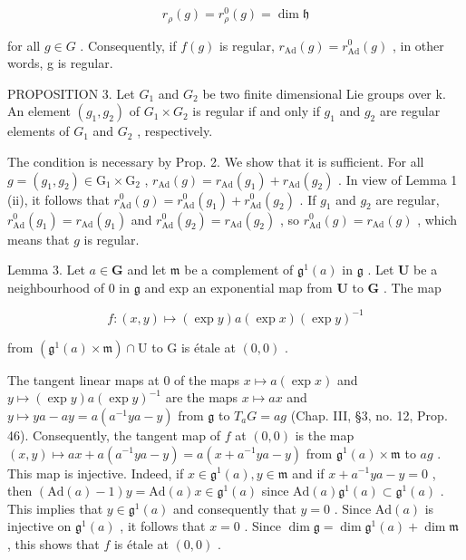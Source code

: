 \[
r _ {\rho} (g) = r _ {\rho} ^ {0} (g) = \dim \mathfrak {h}
\]

for all \(g \in G\) . Consequently, if \(f(g)\) is regular, \(r_{\mathrm{Ad}}(g) = r_{\mathrm{Ad}}^{0}(g)\) , in other words, g is regular.

PROPOSITION 3. Let \(G_{1}\) and \(G_{2}\) be two finite dimensional Lie groups over k. An element \((g_{1}, g_{2})\) of \(G_{1} \times G_{2}\) is regular if and only if \(g_{1}\) and \(g_{2}\) are regular elements of \(G_{1}\) and \(G_{2}\) , respectively.

The condition is necessary by Prop. 2. We show that it is sufficient. For all \(g = (g_{1}, g_{2}) \in \mathrm{G}_{1} \times \mathrm{G}_{2}\) , \(r_{\mathrm{Ad}}(g) = r_{\mathrm{Ad}}(g_{1}) + r_{\mathrm{Ad}}(g_{2})\) . In view of Lemma 1 (ii), it follows that \(r_{\mathrm{Ad}}^{0}(g) = r_{\mathrm{Ad}}^{0}(g_{1}) + r_{\mathrm{Ad}}^{0}(g_{2})\) . If \(g_{1}\) and \(g_{2}\) are regular, \(r_{\mathrm{Ad}}^{0}(g_{1}) = r_{\mathrm{Ad}}(g_{1})\) and \(r_{\mathrm{Ad}}^{0}(g_{2}) = r_{\mathrm{Ad}}(g_{2})\) , so \(r_{\mathrm{Ad}}^{0}(g) = r_{\mathrm{Ad}}(g)\) , which means that \(g\) is regular.

Lemma 3. Let \(a \in \mathbf{G}\) and let \(\mathfrak{m}\) be a complement of \(\mathfrak{g}^1(a)\) in \(\mathfrak{g}\) . Let \(\mathbf{U}\) be a neighbourhood of 0 in \(\mathfrak{g}\) and exp an exponential map from \(\mathbf{U}\) to \(\mathbf{G}\) . The map

\[
f: (x, y) \mapsto (\exp y) a (\exp x) (\exp y) ^ {- 1}
\]

from \((\mathfrak{g}^1 (a)\times \mathfrak{m})\cap \mathrm{U}\) to G is étale at \((0,0)\) .

The tangent linear maps at 0 of the maps \(x \mapsto a(\exp x)\) and \(y \mapsto (\exp y)a(\exp y)^{-1}\) are the maps \(x \mapsto ax\) and \(y \mapsto ya - ay = a(a^{-1}ya - y)\) from \(\mathfrak{g}\) to \(T_aG = ag\) (Chap. III, §3, no. 12, Prop. 46). Consequently, the tangent map of \(f\) at \((0,0)\) is the map \((x,y) \mapsto ax + a(a^{-1}ya - y) = a(x + a^{-1}ya - y)\) from \(\mathfrak{g}^1(a) \times \mathfrak{m}\) to \(ag\) . This map is injective. Indeed, if \(x \in \mathfrak{g}^1(a), y \in \mathfrak{m}\) and if \(x + a^{-1}ya - y = 0\) , then \((\mathrm{Ad}(a) - 1)y = \mathrm{Ad}(a)x \in \mathfrak{g}^1(a)\) since \(\mathrm{Ad}(a)\mathfrak{g}^1(a) \subset \mathfrak{g}^1(a)\) . This implies that \(y \in \mathfrak{g}^1(a)\) and consequently that \(y = 0\) . Since \(\mathrm{Ad}(a)\) is injective on \(\mathfrak{g}^1(a)\) , it follows that \(x = 0\) . Since \(\dim \mathfrak{g} = \dim \mathfrak{g}^1(a) + \dim \mathfrak{m}\) , this shows that \(f\) is étale at \((0,0)\) .

